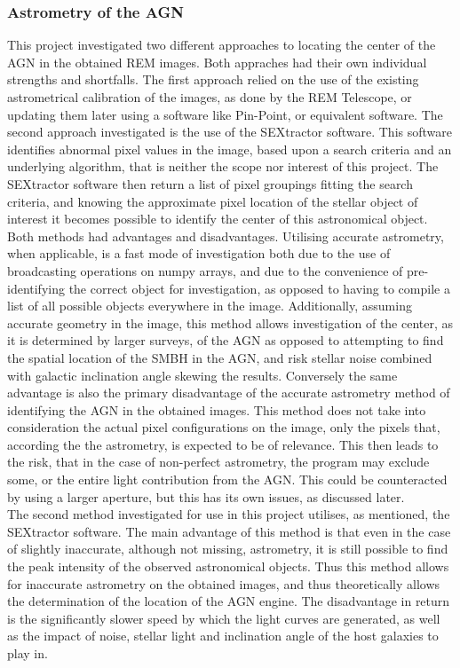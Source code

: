 \documentclass[a4paper, 12pt, twoside]{article}
\begin{document}
\subsubsection{Astrometry of the AGN}
This project investigated two different approaches to locating the center of the AGN in the obtained REM images. Both appraches had their own individual strengths and shortfalls. The first approach relied on the use of the existing astrometrical calibration of the images, as done by the REM Telescope, or updating them later using a software like Pin-Point, or equivalent software. The second approach investigated is the use of the SEXtractor software. This software identifies abnormal pixel values in the image, based upon a search criteria and an underlying algorithm, that is neither the scope nor interest of this project. The SEXtractor software then return a list of pixel groupings fitting the search criteria, and knowing the approximate pixel location of the stellar object of interest it becomes possible to identify the center of this astronomical object. \\
Both methods had advantages and disadvantages. Utilising accurate astrometry, when applicable, is a fast mode of investigation both due to the use of broadcasting operations on numpy arrays, and due to the convenience of pre-identifying the correct object for investigation, as opposed to having to compile a list of all possible objects everywhere in the image. Additionally, assuming accurate geometry in the image, this method allows investigation of the center, as it is determined by larger surveys, of the AGN as opposed to attempting to find the spatial location of the SMBH in the AGN, and risk stellar noise combined with galactic inclination angle skewing the results. Conversely the same advantage is also the primary disadvantage of the accurate astrometry method of identifying the AGN in the obtained images. This method does not take into consideration the actual pixel configurations on the image, only the pixels that, according the the astrometry, is expected to be of relevance. This then leads to the risk, that in the case of non-perfect astrometry, the program may exclude some, or the entire light contribution from the AGN. This could be counteracted by using a larger aperture, but this has its own issues, as discussed later. \\
The second method investigated for use in this project utilises, as mentioned, the SEXtractor software. The main advantage of this method is that even in the case of slightly inaccurate, although not missing, astrometry, it is still possible to find the peak intensity of the observed astronomical objects. Thus this method allows for inaccurate astrometry on the obtained images, and thus theoretically allows the determination of the location of the AGN engine. The disadvantage in return is the significantly slower speed by which the light curves are generated, as well as the impact of noise, stellar light and inclination angle of the host galaxies to play in. \\
\end{document}
